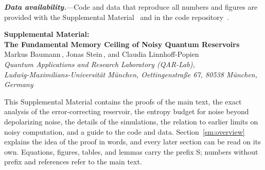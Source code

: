 \documentclass[aps,prl,twocolumn,superscriptaddress,floatfix]{revtex4-2}
\theoremstyle{plain}
\newcommand{\runin}[1]{\textit{\textbf{#1}}---}
\begin{document}
\runin{Data availability.}Code and data that reproduce all numbers and figures are provided with the Supplemental Material~\cite{SM} and in the code repository~\cite{CodeRepository}.

\nocite{Xiong2025,Dao2026}


\clearpage
\onecolumngrid
\setcounter{equation}{0}
\setcounter{figure}{0}
\setcounter{table}{0}
\setcounter{section}{0}
\setcounter{lemma}{0}
\setcounter{page}{1}
\renewcommand{\theequation}{S\arabic{equation}}
\renewcommand{\theHequation}{S\arabic{equation}}
\renewcommand{\thefigure}{S\arabic{figure}}
\renewcommand{\thetable}{S\arabic{table}}
\renewcommand{\thelemma}{S\arabic{lemma}}
\renewcommand{\thepage}{S\arabic{page}}
\renewcommand{\theHfigure}{S\arabic{figure}}
\renewcommand{\theHtable}{S\arabic{table}}
\setcounter{secnumdepth}{3}

\begin{center}
{\large\bfseries Supplemental Material:\\[3pt] The Fundamental Memory Ceiling of Noisy Quantum Reservoirs}\\[10pt]
Markus Baumann\,, Jonas Stein\,, and Claudia Linnhoff-Popien\,\\[3pt]
{\small\itshape Quantum Applications and Research Laboratory (QAR-Lab),\\
Ludwig-Maximilians-Universit\"at M\"unchen, Oettingenstra\ss e 67, 80538 M\"unchen, Germany}
\end{center}

This Supplemental Material contains the proofs of the main text, the exact analysis of the error-correcting reservoir, the entropy budget for noise beyond depolarizing noise, the details of the simulations, the relation to earlier limits on noisy computation, and a guide to the code and data. Section~\ref{sm:overview} explains the idea of the proof in words, and every later section can be read on its own. Equations, figures, tables, and lemmas carry the prefix S; numbers without prefix and references refer to the main text.

\let\addcontentsline\SMaddcontentsline
\tableofcontents
\vspace{8pt}
\end{document}
